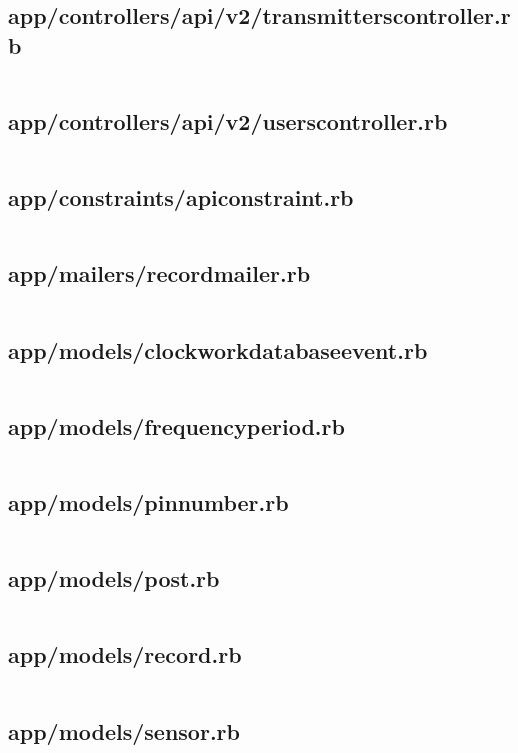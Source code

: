\documentclass[letterpaper, 12 pt]{article}
\begin{document}
\subsection{app/controllers/api/v2/transmitters\textunderscore controller.rb}
\inputminted{ruby}{../app/controllers/api/v2/transmitters_controller.rb}
\subsection{app/controllers/api/v2/users\textunderscore controller.rb}
\inputminted{ruby}{../app/controllers/api/v2/users_controller.rb}

\subsection{app/constraints/api\textunderscore constraint.rb}
\inputminted{ruby}{../app/cnstraints/api_constraint.rb}

\subsection{app/mailers/record\textunderscore mailer.rb}
\inputminted{ruby}{../app/mailers/record_mailer.rb}

\subsection{app/models/clockwork\textunderscore database\textunderscore event.rb}
\inputminted{ruby}{../app/models/clockwork_database_event.rb}
\subsection{app/models/frequency\textunderscore period.rb}
\inputminted{ruby}{../app/models/frequency_period.rb}
\subsection{app/models/pin\textunderscore number.rb}
\inputminted{ruby}{../app/models/pin_number.rb}
\subsection{app/models/post.rb}
\inputminted{ruby}{../app/models/post.rb}
\subsection{app/models/record.rb}
\inputminted{ruby}{../app/models/record.rb}
\subsection{app/models/sensor.rb}
\inputminted{ruby}{../app/models/sensor.rb}
\end{document}
